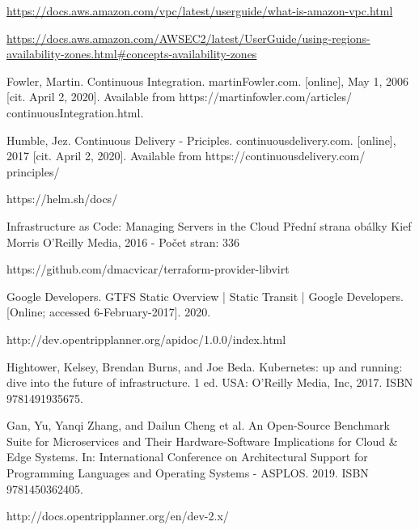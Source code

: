 \documentclass[thesis=M,czech]{FITthesis}[2019/12/23]
\theoremstyle{plain}
\theoremstyle{definition}
\begin{document}
\begin{thebibliography}{9}


\url{https://docs.aws.amazon.com/vpc/latest/userguide/what-is-amazon-vpc.html
}


\url{https://docs.aws.amazon.com/AWSEC2/latest/UserGuide/using-regions-availability-zones.html#concepts-availability-zones
}


Fowler, Martin. Continuous Integration. martinFowler.com. [online], May 1,
2006 [cit. April 2, 2020]. Available from https://martinfowler.com/articles/
continuousIntegration.html.


Humble, Jez. Continuous Delivery - Priciples. continuousdelivery.com. [online],
2017 [cit. April 2, 2020]. Available from https://continuousdelivery.com/
principles/

https://helm.sh/docs/



Infrastructure as Code: Managing Servers in the Cloud
Přední strana obálky
Kief Morris
O'Reilly Media, 2016 - Počet stran: 336


https://github.com/dmacvicar/terraform-provider-libvirt


Google Developers. GTFS Static Overview | Static Transit | Google Developers. [Online; accessed 6-February-2017]. 2020.


http://dev.opentripplanner.org/apidoc/1.0.0/index.html


Hightower, Kelsey, Brendan Burns, and Joe Beda. Kubernetes: up and running: dive into the future of infrastructure. 1 ed. USA: O’Reilly Media, Inc, 2017.
ISBN 9781491935675.



Gan, Yu, Yanqi Zhang, and Dailun Cheng et al. An Open-Source Benchmark
Suite for Microservices and Their Hardware-Software Implications for Cloud \&
Edge Systems. In: International Conference on Architectural Support for Programming Languages and Operating Systems - ASPLOS. 2019. ISBN 9781450362405.




http://docs.opentripplanner.org/en/dev-2.x/



\end{thebibliography}
\end{document}
